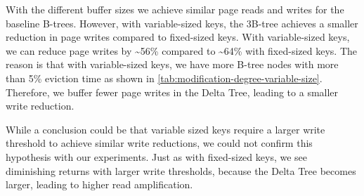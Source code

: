 With the different buffer sizes we achieve similar page reads and writes for the baseline B-trees.
However, with variable-sized keys, the 3B-tree achieves a smaller reduction in page writes compared to fixed-sized keys.
With variable-sized keys, we can reduce page writes by \textasciitilde56\% compared to \textasciitilde64\% with fixed-sized keys.
The reason is that with variable-sized keys, we have more B-tree nodes with more than 5\% eviction time as shown in \autoref{tab:modification-degree-variable-size}.
Therefore, we buffer fewer page writes in the Delta Tree, leading to a smaller write reduction.

While a conclusion could be that variable sized keys require a larger write threshold to achieve similar write reductions, we could not confirm this hypothesis with our experiments.
Just as with fixed-sized keys, we see diminishing returns with larger write thresholds, because the Delta Tree becomes larger, leading to higher read amplification.

